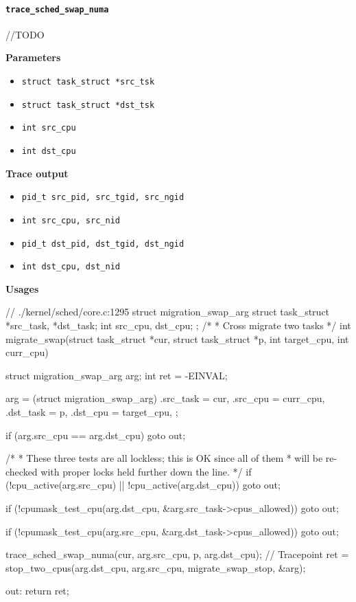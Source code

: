 \paragraph{\texttt{trace\_sched\_swap\_numa}}
//TODO

\textbf{Parameters}
\begin{itemize}
    \item \verb|struct task_struct *src_tsk|
    \item \verb|struct task_struct *dst_tsk|
    \item \verb|int src_cpu|
    \item \verb|int dst_cpu|    
\end{itemize}

\textbf{Trace output}
\begin{itemize}
    \item \verb|pid_t src_pid, src_tgid, src_ngid|
    \item \verb|int src_cpu, src_nid|
    \item \verb|pid_t dst_pid, dst_tgid, dst_ngid|
    \item \verb|int dst_cpu, dst_nid|
\end{itemize}

\textbf{Usages}
\begin{code}
// ./kernel/sched/core.c:1295
struct migration_swap_arg {
	struct task_struct *src_task, *dst_task;
	int src_cpu, dst_cpu;
};
/*
 * Cross migrate two tasks
 */
int migrate_swap(struct task_struct *cur, struct task_struct *p,
		int target_cpu, int curr_cpu){
	struct migration_swap_arg arg;
	int ret = -EINVAL;

	arg = (struct migration_swap_arg){
		.src_task = cur,
		.src_cpu = curr_cpu,
		.dst_task = p,
		.dst_cpu = target_cpu,
	};

	if (arg.src_cpu == arg.dst_cpu)
		goto out;

	/*
	 * These three tests are all lockless; this is OK since all of them
	 * will be re-checked with proper locks held further down the line.
	 */
	if (!cpu_active(arg.src_cpu) || !cpu_active(arg.dst_cpu))
		goto out;

	if (!cpumask_test_cpu(arg.dst_cpu, &arg.src_task->cpus_allowed))
		goto out;

	if (!cpumask_test_cpu(arg.src_cpu, &arg.dst_task->cpus_allowed))
		goto out;

	trace_sched_swap_numa(cur, arg.src_cpu, p, arg.dst_cpu); // Tracepoint
	ret = stop_two_cpus(arg.dst_cpu, arg.src_cpu, migrate_swap_stop, &arg);

out:
	return ret;
}
\end{code}

